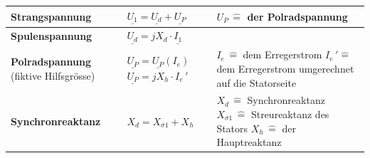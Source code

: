    \begin{tabular}[b]{| C{5cm}| P{8.5cm} | P{5 cm} |}
    	\hline
        \textbf{Strangspannung} 	&
        $\underline{U_1\!} = \underline{U_d\!} + \underline{U_P\!}$ &
        $U_P \, \widehat{=}$ der Polradspannung
        \\ \hline
        
        \textbf{Spulenspannung}	&
        $\underline{U_d} = jX_d\cdot \underline{I_1}$ &
        \\ \hline
        
        \textbf{Polradspannung} \newline (fiktive Hilfsgrösse) &
        $\underline{U_P} = \underline{U_P}\left(I_e\right)$ \newline\newline
        $\underline{U_P} = jX_h\cdot I_{e}\,'$  &
        $I_e \, \widehat{=}$ dem Erregerstrom \newline
        $I_e\,' \widehat{=}$ dem Erregerstrom umgerechnet auf die Statorseite
        \\ \hline
        
        \textbf{Synchronreaktanz} &
        $X_d = X_{\sigma 1} + X_h$ &
        $X_d \, \widehat{=} $ Synchronreaktanz \newline
        $X_{\sigma 1} \, \widehat{=}$ Streureaktanz des Stators \newline
        $X_h \, \widehat{=}$ der Hauptreaktanz
        \\ \hline
        

\end{tabular}
